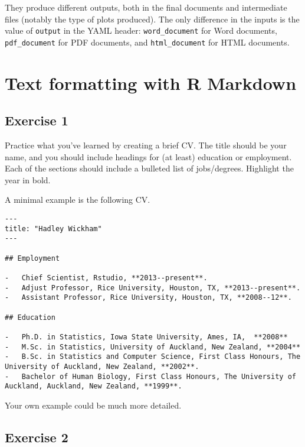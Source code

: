 \documentclass[]{book}
\theoremstyle{plain}
\theoremstyle{remark}
\theoremstyle{definition}
\theoremstyle{definition}
\theoremstyle{definition}
\theoremstyle{remark}
\begin{document}
They produce different outputs, both in the final documents and
intermediate files (notably the type of plots produced). The only
difference in the inputs is the value of \texttt{output} in the YAML
header: \texttt{word\_document} for Word documents,
\texttt{pdf\_document} for PDF documents, and \texttt{html\_document}
for HTML documents.

\hypertarget{text-formatting-with-r-markdown}{%
\section{Text formatting with R
Markdown}\label{text-formatting-with-r-markdown}}

\hypertarget{exercise-1-71}{%
\subsection{Exercise 1}\label{exercise-1-71}}

Practice what you've learned by creating a brief CV. The title should be
your name, and you should include headings for (at least) education or
employment. Each of the sections should include a bulleted list of
jobs/degrees. Highlight the year in bold.

A minimal example is the following CV.

\begin{verbatim}
---
title: "Hadley Wickham"
---

## Employment

-   Chief Scientist, Rstudio, **2013--present**.
-   Adjust Professor, Rice University, Houston, TX, **2013--present**.
-   Assistant Professor, Rice University, Houston, TX, **2008--12**.

## Education

-   Ph.D. in Statistics, Iowa State University, Ames, IA,  **2008**
-   M.Sc. in Statistics, University of Auckland, New Zealand, **2004**
-   B.Sc. in Statistics and Computer Science, First Class Honours, The University of Auckland, New Zealand, **2002**.
-   Bachelor of Human Biology, First Class Honours, The University of Auckland, Auckland, New Zealand, **1999**.
\end{verbatim}

Your own example could be much more detailed.

\hypertarget{exercise-2-69}{%
\subsection{Exercise 2}\label{exercise-2-69}}
\end{document}
